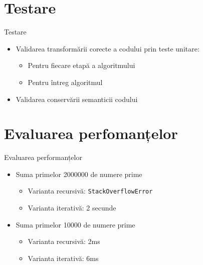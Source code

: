 \documentclass{beamer}
\def\code#1{\texttt{#1}}
\begin{document}
\section{Testare}

\begin{frame}{Testare}
    \begin{itemize}
        \item Validarea transformării corecte a codului prin teste unitare:
        \begin{itemize}
            \item Pentru fiecare etapă a algoritmului
            \item Pentru întreg algoritmul
        \end{itemize}
        \item Validarea conservării semanticii codului
    \end{itemize}
\end{frame}
	
\section{Evaluarea perfomanțelor}

\begin{frame}{Evaluarea performanțelor}
    \begin{itemize}
        \item Suma primelor 2000000 de numere prime
        \begin{itemize}
            \item Varianta recursivă: \code{StackOverflowError}
            \item Varianta iterativă: 2 secunde
        \end{itemize}
        \item Suma primelor 10000 de numere prime
        \begin{itemize}
            \item Varianta recursivă: 2ms
            \item Varianta iterativă: 6ms
        \end{itemize}
    \end{itemize}
\end{frame}
\end{document}

